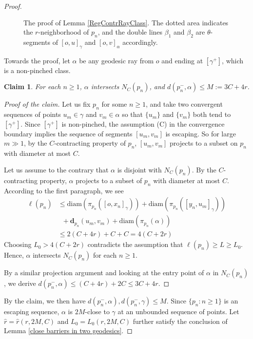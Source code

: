 \documentclass{amsart}
\newtheorem*{claim}{Claim}
\theoremstyle{definition}
\theoremstyle{remark}
\newcommand{\proj}{\textbf{d}}
\begin{document}
\begin{proof}
\begin{figure}
\begin{tikzpicture}[x=0.75pt,y=0.75pt,yscale=-1,xscale=1]
\end{tikzpicture}
    \caption{The proof of Lemma \ref{RegContrRayClass}. The dotted area indicates the $r$-neighborhood of $p_n$, and the double lines $\beta_1$ and $\beta_2$ are $\theta$-segments of $[o,u]_\gamma$ and $[o,v]_\alpha$ accordingly.}
    \label{fig:placeholder}
\end{figure} 
Towards the proof, let $\alpha$ be any geodesic ray from $o$ and ending at $[\gamma^+]$, which is a non-pinched class. %
\begin{claim}
For each $n\ge 1$, $\alpha$ intersects $N_{C}(p_n)$, and $d(p_n^-,\alpha)\le  M:=3C+4r$. 
\end{claim}
\begin{proof}[Proof of the claim]
Let us fix $p_n$ for some $n\ge 1$, and take  two convergent sequences of points  $u_m\in \gamma$ and $v_m\in \alpha$ so that $\{u_m\}$ and $\{v_m\}$ both tend to  $[\gamma^+]$. Since $[\gamma^+]$ is non-pinched,   the assumption (C) in the convergence boundary implies the sequence of segments $[u_m,v_m]$ is escaping. So for large $m\gg 1$, by the $C$-contracting property of $p_n$, $[u_m,v_m]$ projects to a subset on $p_n$ with diameter at most $C$. 

Let us assume to the contrary that $\alpha$ is disjoint with $N_{C}(p_n)$. By the $C$-contracting property, $\alpha$   projects to a subset of $p_n$ with diameter at most $C$.   According to the first paragraph, we see $$
\begin{aligned}
\ell(p_n) &\le \mathrm{diam}(\pi_{p_n}([o,x_n]_\gamma))+\mathrm{diam}(\pi_{p_n}([y_n,u_m]_\gamma))\\
&\;\;+\proj_{p_n}(u_m,v_m)+\mathrm{diam}(\pi_{p_n}(\alpha))  \\
&\le 2(C+4r)+C+C=4(C+2r)    
\end{aligned}$$  Choosing $L_0>4(C+2r)$  contradicts the assumption that $\ell(p_n)\ge L\ge L_0$. Hence, $\alpha$ intersects $N_{C}(p_n)$ for each $n\ge 1$. 

By a similar projection argument and  looking at the entry point of $\alpha$ in $N_{C}(p_n)$, we  derive $d(p_n^-,\alpha)\le (C+4r)+ 2C\le 3C+4r$.    
\end{proof}
By the claim, we then have $d(p_n^-,\alpha),d(p_n^-,\gamma)\le M$. Since $\{p_n:n\ge 1\}$ is an {escaping} sequence, $\alpha$ is $2M$-close to  $\gamma$ at an unbounded sequence of points. Let $\hat r=\hat r(r,2M,C)$  and $L_0=L_0(r,2M,C)$ further  satisfy the conclusion of Lemma \ref{close barriers in two geodesics}.  %


\end{proof}
\end{document}
